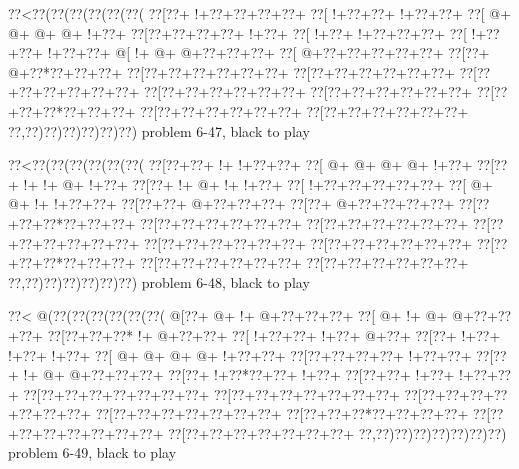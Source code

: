 \vbox{\vbox{\goo
\0??<\0??(\0??(\0??(\0??(\0??(\0??(
\0??[\0??+\- !+\0??+\0??+\0??+\0??+
\0??[\- !+\0??+\0??+\- !+\0??+\0??+
\0??[\- @+\- @+\- @+\- @+\- !+\0??+
\0??[\0??+\0??+\0??+\0??+\- !+\0??+
\0??[\- !+\0??+\- !+\0??+\0??+\0??+
\0??[\- !+\0??+\0??+\- !+\0??+\0??+
\- @[\- !+\- @+\- @+\0??+\0??+\0??+
\0??[\- @+\0??+\0??+\0??+\0??+\0??+
\0??[\0??+\- @+\0??*\0??+\0??+\0??+
\0??[\0??+\0??+\0??+\0??+\0??+\0??+
\0??[\0??+\0??+\0??+\0??+\0??+\0??+
\0??[\0??+\0??+\0??+\0??+\0??+\0??+
\0??[\0??+\0??+\0??+\0??+\0??+\0??+
\0??[\0??+\0??+\0??+\0??+\0??+\0??+
\0??[\0??+\0??+\0??*\0??+\0??+\0??+
\0??[\0??+\0??+\0??+\0??+\0??+\0??+
\0??[\0??+\0??+\0??+\0??+\0??+\0??+
\0??,\0??)\0??)\0??)\0??)\0??)\0??)
}
\hfil problem 6-47, black to play\hfil\break
}

\vbox{\vbox{\goo
\0??<\0??(\0??(\0??(\0??(\0??(\0??(
\0??[\0??+\0??+\- !+\- !+\0??+\0??+
\0??[\- @+\- @+\- @+\- @+\- !+\0??+
\0??[\0??+\- !+\- !+\- @+\- !+\0??+
\0??[\0??+\- !+\- @+\- !+\- !+\0??+
\0??[\- !+\0??+\0??+\0??+\0??+\0??+
\0??[\- @+\- @+\- !+\- !+\0??+\0??+
\0??[\0??+\0??+\- @+\0??+\0??+\0??+
\0??[\0??+\- @+\0??+\0??+\0??+\0??+
\0??[\0??+\0??+\0??*\0??+\0??+\0??+
\0??[\0??+\0??+\0??+\0??+\0??+\0??+
\0??[\0??+\0??+\0??+\0??+\0??+\0??+
\0??[\0??+\0??+\0??+\0??+\0??+\0??+
\0??[\0??+\0??+\0??+\0??+\0??+\0??+
\0??[\0??+\0??+\0??+\0??+\0??+\0??+
\0??[\0??+\0??+\0??*\0??+\0??+\0??+
\0??[\0??+\0??+\0??+\0??+\0??+\0??+
\0??[\0??+\0??+\0??+\0??+\0??+\0??+
\0??,\0??)\0??)\0??)\0??)\0??)\0??)
}
\hfil problem 6-48, black to play\hfil\break
}

\vbox{\vbox{\goo
\0??<\- @(\0??(\0??(\0??(\0??(\0??(\0??(
\- @[\0??+\- @+\- !+\- @+\0??+\0??+\0??+
\0??[\- @+\- !+\- @+\- @+\0??+\0??+\0??+
\0??[\0??+\0??+\0??*\- !+\- @+\0??+\0??+
\0??[\- !+\0??+\0??+\- !+\0??+\- @+\0??+
\0??[\0??+\- !+\0??+\- !+\0??+\- !+\0??+
\0??[\- @+\- @+\- @+\- @+\- !+\0??+\0??+
\0??[\0??+\0??+\0??+\0??+\- !+\0??+\0??+
\0??[\0??+\- !+\- @+\- @+\0??+\0??+\0??+
\0??[\0??+\- !+\0??*\0??+\0??+\- !+\0??+
\0??[\0??+\0??+\- !+\0??+\- !+\0??+\0??+
\0??[\0??+\0??+\0??+\0??+\0??+\0??+\0??+
\0??[\0??+\0??+\0??+\0??+\0??+\0??+\0??+
\0??[\0??+\0??+\0??+\0??+\0??+\0??+\0??+
\0??[\0??+\0??+\0??+\0??+\0??+\0??+\0??+
\0??[\0??+\0??+\0??*\0??+\0??+\0??+\0??+
\0??[\0??+\0??+\0??+\0??+\0??+\0??+\0??+
\0??[\0??+\0??+\0??+\0??+\0??+\0??+\0??+
\0??,\0??)\0??)\0??)\0??)\0??)\0??)\0??)
}
\hfil problem 6-49, black to play\hfil\break
}

